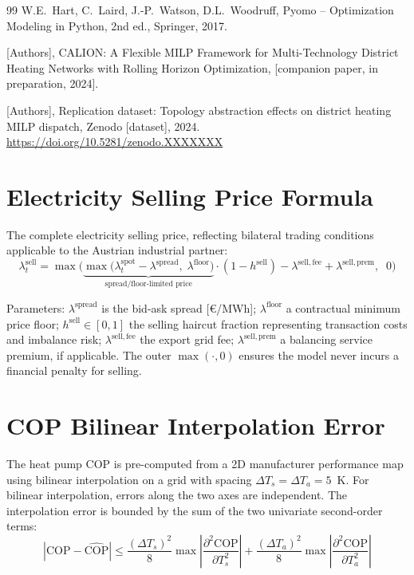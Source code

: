 \documentclass[review,3p]{elsarticle}
\begin{document}
\begin{thebibliography}{99}
W.E.\ Hart, C.\ Laird, J.-P.\ Watson, D.L.\ Woodruff,
Pyomo -- Optimization Modeling in Python, 2nd ed.,
Springer, 2017.

[Authors], CALION: A Flexible MILP Framework for Multi-Technology
District Heating Networks with Rolling Horizon Optimization,
[companion paper, in preparation, 2024].

[Authors], Replication dataset: Topology abstraction effects on
district heating MILP dispatch, Zenodo [dataset], 2024.
\url{https://doi.org/10.5281/zenodo.XXXXXXX}

\end{thebibliography}

\appendix

\section{Electricity Selling Price Formula}
\label{app:selling_price}

The complete electricity selling price, reflecting bilateral trading
conditions applicable to the Austrian industrial partner:
\begin{equation}
\lambda_t^{\mathrm{sell}} = \max\!\Bigg(\!
\underbrace{
\max\!\big(\lambda_t^{\mathrm{spot}} - \lambda^{\mathrm{spread}},\;
\lambda^{\mathrm{floor}}\big)
}_{\text{spread/floor-limited price}}
\cdot (1 - h^{\mathrm{sell}})
- \lambda^{\mathrm{sell,fee}} + \lambda^{\mathrm{sell,prem}},
\;\; 0\Bigg)
\end{equation}

Parameters: $\lambda^{\mathrm{spread}}$ is the bid-ask spread [\euro/MWh];
$\lambda^{\mathrm{floor}}$ a contractual minimum price floor;
$h^{\mathrm{sell}} \in [0,1]$ the selling haircut fraction representing
transaction costs and imbalance risk; $\lambda^{\mathrm{sell,fee}}$ the
export grid fee; $\lambda^{\mathrm{sell,prem}}$ a balancing service
premium, if applicable. The outer $\max(\cdot, 0)$ ensures the model
never incurs a financial penalty for selling.

\section{COP Bilinear Interpolation Error}
\label{app:cop}

The heat pump COP is pre-computed from a 2D manufacturer performance
map using bilinear interpolation on a grid with spacing
$\Delta T_s = \Delta T_a = 5$~K. For bilinear interpolation, errors
along the two axes are independent. The interpolation error is bounded
by the sum of the two univariate second-order terms:
\begin{equation}
|\mathrm{COP} - \widehat{\mathrm{COP}}| \leq
\frac{(\Delta T_s)^2}{8}
\max \left|\frac{\partial^2 \mathrm{COP}}{\partial T_s^2}\right|
+ \frac{(\Delta T_a)^2}{8}
\max \left|\frac{\partial^2 \mathrm{COP}}{\partial T_a^2}\right|
\label{eq:cop_error}
\end{equation}
\end{document}
